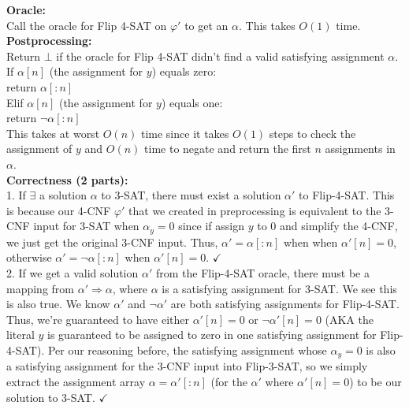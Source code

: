 \documentclass[11pt]{article}
\begin{document}
\begin{enumerate}
\begin{enumerate}
        \textbf{Oracle:} \\

        Call the oracle for Flip 4-SAT on $\varphi'$ to get an $\alpha$. This takes $O(1)$ time. \\

        \textbf{Postprocessing:} \\

        Return $\bot$ if the oracle for Flip 4-SAT didn't find a valid satisfying assignment $\alpha$. \\

        If $\alpha[n]$ (the assignment for $y$) equals zero: \\
            return $\alpha[:n]$ \\
            
        Elif $\alpha[n]$ (the assignment for $y$) equals one: \\
            return $\neg \alpha[:n]$ \\

        This takes at worst $O(n)$ time since it takes $O(1)$ steps to check the assignment of $y$ and $O(n)$ time to negate and return the first $n$ assignments in $\alpha$. \\

        \textbf{Correctness (2 parts):} \\

        1. If $\exists$ a solution $\alpha$ to 3-SAT, there must exist a solution $\alpha'$ to Flip-4-SAT. This is because our 4-CNF $\varphi'$ that we created in preprocessing is equivalent to the 3-CNF input for 3-SAT when $\alpha_y=0$ since if assign $y$ to $0$ and simplify the 4-CNF, we just get the original 3-CNF input. Thus, $\alpha' = \alpha[:n]$ when when $\alpha'[n] = 0$, otherwise $\alpha' = \neg \alpha[:n]$ when $\alpha'[n] = 0$. $\checkmark$ \\

        2. If we get a valid solution $\alpha'$ from the Flip-4-SAT oracle, there must be a mapping from $\alpha' \Rightarrow \alpha$, where $\alpha$ is a satisfying assignment for 3-SAT. We see this is also true. We know $\alpha'$ and $\neg \alpha'$ are both satisfying assignments for Flip-4-SAT. Thus, we're guaranteed to have either $\alpha'[n] = 0$ or $\neg \alpha'[n] = 0$ (AKA the literal $y$ is guaranteed to be assigned to zero in one satisfying assignment for Flip-4-SAT). Per our reasoning before, the satisfying assignment whose $\alpha_y = 0$ is also a satisfying assignment for the 3-CNF input into Flip-3-SAT, so we simply extract the assignment array $\alpha = \alpha'[:n]$ (for the $\alpha'$ where $\alpha'[n] = 0$) to be our solution to 3-SAT. $\checkmark$ \\


\end{enumerate}
\end{enumerate}
\end{document}
